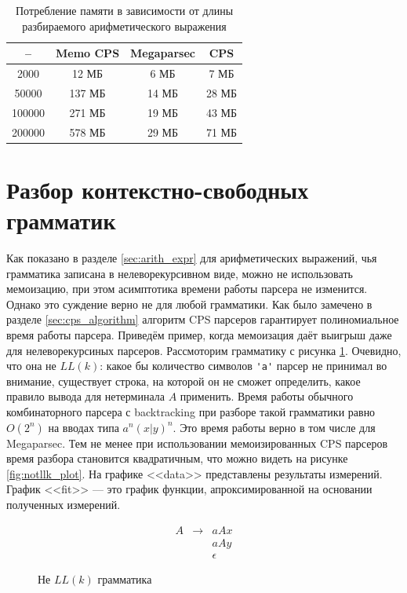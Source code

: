 \documentclass[times]{itmo-student-thesis}
\begin{document}
\begin{table}[!h]
  \caption{Потребление памяти в зависимости от длины разбираемого арифметического выражения}\label{tab:arith_memory}
  \centering
  \begin{tabular}{|*{4}{c|}}\hline
    --     & Memo CPS & Megaparsec & CPS   \\\hline
    2000   & 12 МБ    & 6 МБ       & 7 МБ  \\\hline
    50000  & 137 МБ   & 14 МБ      & 28 МБ \\\hline
    100000 & 271 МБ   & 19 МБ      & 43 МБ \\\hline
    200000 & 578 МБ   & 29 МБ      & 71 МБ \\\hline
  \end{tabular}
\end{table}

\section{Разбор контекстно-свободных грамматик}\label{sec:context_free}

Как показано в разделе \ref{sec:arith_expr} для арифметических выражений, чья грамматика записана в нелеворекурсивном
виде, можно не использовать мемоизацию, при этом асимптотика времени работы парсера не изменится. Однако это суждение верно не
для любой грамматики. Как было замечено в разделе \ref{sec:cps_algorithm} алгоритм CPS парсеров гарантирует полиномиальное время
работы парсера. Приведём пример, когда мемоизация даёт выигрыш даже для нелеворекурсиных парсеров. Рассмоторим
грамматику с рисунка \ref{fig:not_llk_grmmar}. Очевидно, что она не $LL(k)$: какое бы количество символов
\lstinline{'a'} парсер не принимал во внимание, существует строка, на которой он не сможет  определить, какое
правило вывода для нетерминала $A$ применить. Время работы обычного комбинаторного парсера с
backtracking при разборе такой грамматики равно $O(2^n)$ на вводах типа $a^n(x|y)^n$. Это время
работы верно в том числе для Megaparsec.  Тем не менее при использовании мемоизированных CPS парсеров время разбора
становится квадратичным, что можно видеть на рисунке \ref{fig:notllk_plot}. На графике <<data>> представлены результаты
измерений. График <<fit>> --- это график функции, апроксимированной  на основании полученных измерений.

\begin{figure}[!h]
  \caption{Не $LL(k)$ грамматика}\label{fig:not_llk_grmmar}
  \[
      \begin{array}{lll}
          A & \to & a A x \\
            &     & a A y \\
            &     & \epsilon
      \end{array}
  \]
\end{figure}
\end{document}
